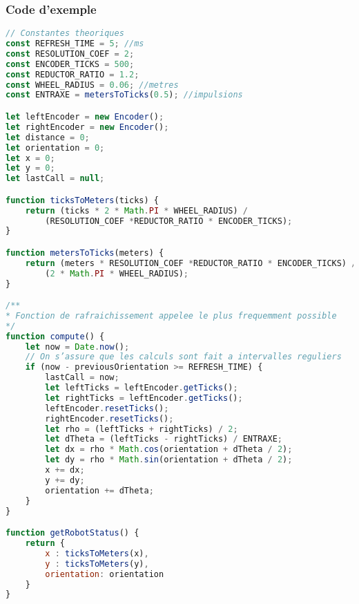         \subsubsection{Code d'exemple}
            \begin{lstlisting}[language=JavaScript]
// Constantes theoriques
const REFRESH_TIME = 5; //ms
const RESOLUTION_COEF = 2;
const ENCODER_TICKS = 500;
const REDUCTOR_RATIO = 1.2;
const WHEEL_RADIUS = 0.06; //metres
const ENTRAXE = metersToTicks(0.5); //impulsions

let leftEncoder = new Encoder();
let rightEncoder = new Encoder();
let distance = 0;
let orientation = 0;
let x = 0;
let y = 0;
let lastCall = null;

function ticksToMeters(ticks) {
    return (ticks * 2 * Math.PI * WHEEL_RADIUS) /
        (RESOLUTION_COEF *REDUCTOR_RATIO * ENCODER_TICKS);
}

function metersToTicks(meters) {
    return (meters * RESOLUTION_COEF *REDUCTOR_RATIO * ENCODER_TICKS) /
        (2 * Math.PI * WHEEL_RADIUS);
}

/**
* Fonction de rafraichissement appelee le plus frequemment possible
*/
function compute() {
    let now = Date.now();
    // On s’assure que les calculs sont fait a intervalles reguliers
    if (now - previousOrientation >= REFRESH_TIME) {
        lastCall = now;
        let leftTicks = leftEncoder.getTicks();
        let rightTicks = leftEncoder.getTicks();
        leftEncoder.resetTicks();
        rightEncoder.resetTicks();
        let rho = (leftTicks + rightTicks) / 2;
        let dTheta = (leftTicks - rightTicks) / ENTRAXE;
        let dx = rho * Math.cos(orientation + dTheta / 2);
        let dy = rho * Math.sin(orientation + dTheta / 2);
        x += dx;
        y += dy;
        orientation += dTheta;
    }
}

function getRobotStatus() {
    return {
        x : ticksToMeters(x),
        y : ticksToMeters(y),
        orientation: orientation
    }
}
        \end{lstlisting}